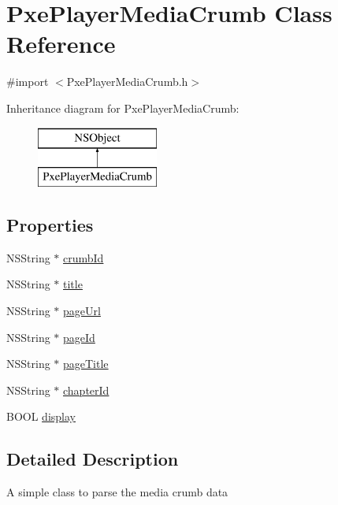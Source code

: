 \hypertarget{interface_pxe_player_media_crumb}{\section{Pxe\-Player\-Media\-Crumb Class Reference}
\label{interface_pxe_player_media_crumb}
}


{\ttfamily \#import $<$Pxe\-Player\-Media\-Crumb.\-h$>$}

Inheritance diagram for Pxe\-Player\-Media\-Crumb\-:\begin{figure}[H]
\begin{center}
\leavevmode
\includegraphics[height=2.000000cm]{interface_pxe_player_media_crumb}
\end{center}
\end{figure}
\subsection*{Properties}
\begin{DoxyCompactItemize}
\item 
N\-S\-String $\ast$ \hyperlink{interface_pxe_player_media_crumb_ae1417eb81b8ed21748e02f174fb86612}{crumb\-Id}
\item 
N\-S\-String $\ast$ \hyperlink{interface_pxe_player_media_crumb_a9f0fb13437b39aa1b9f3873798ef5ff5}{title}
\item 
N\-S\-String $\ast$ \hyperlink{interface_pxe_player_media_crumb_a032ff36d5fb4c487998aff6e3d476a73}{page\-Url}
\item 
N\-S\-String $\ast$ \hyperlink{interface_pxe_player_media_crumb_a9f010f5e636db55248d7e556b11ee372}{page\-Id}
\item 
N\-S\-String $\ast$ \hyperlink{interface_pxe_player_media_crumb_a757ee56ef803a58fdbb6e609132ccfcf}{page\-Title}
\item 
N\-S\-String $\ast$ \hyperlink{interface_pxe_player_media_crumb_a6ac80fedf132a565c043be81c528e508}{chapter\-Id}
\item 
B\-O\-O\-L \hyperlink{interface_pxe_player_media_crumb_a052b99037caeea4d5fc07a0283e7f975}{display}
\end{DoxyCompactItemize}


\subsection{Detailed Description}
A simple class to parse the media crumb data 

